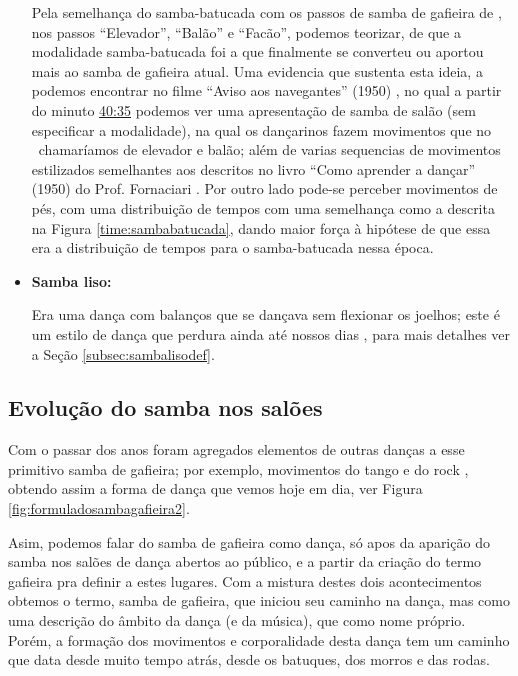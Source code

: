 \begin{itemize}
Pela semelhança do samba-batucada com os passos de samba de gafieira de \AnoLivro,
nos passos ``Elevador'', ``Balão'' e ``Facão'', podemos teorizar, de que a modalidade samba-batucada foi
a que finalmente se converteu ou aportou mais ao samba de gafieira atual.
Uma evidencia que sustenta esta ideia, a podemos encontrar no filme ``Aviso aos navegantes'' (1950) \cite[min. 40:35]{AtlantidaDance},
no qual a partir do minuto \href{http://www.bcc.org.br/filmes/443382}{40:35} podemos ver uma apresentação de samba de salão (sem especificar a modalidade),
na qual os dançarinos fazem movimentos que no \AnoLivro~chamaríamos de elevador e balão; 
além de varias sequencias de movimentos estilizados semelhantes aos descritos no livro ``Como aprender a dançar'' (1950) do Prof. Fornaciari \cite[pp. 163]{fornaciari1950aprender}.
Por outro lado pode-se perceber movimentos de pés, 
com uma distribuição de tempos com uma semelhança como a descrita na Figura \ref{time:sambabatucada},
dando maior força à hipótese de que essa era a distribuição de tempos para o samba-batucada nessa época. 

\item \textbf{Samba liso:}

Era uma dança com balanços que se dançava sem flexionar os joelhos;
este é um estilo de dança que perdura ainda até nossos 
dias \cite[pp. 58,62]{freitas1959danca} \cite[pp. 61]{fornaciari1950aprender} \cite[pp. 143]{perna2002samba}, 
para mais detalhes ver a Seção \ref{subsec:sambalisodef}.
\end{itemize}

\subsection{Evolução do samba nos salões}

Com o passar dos anos foram agregados elementos de outras danças a esse primitivo samba de gafieira;
por exemplo, movimentos do tango e do rock \cite[pp. 142]{perna2002samba}, 
obtendo assim a forma de dança que vemos hoje em dia, ver Figura \ref{fig:formuladosambagafieira2}.

Asim, podemos falar do samba de gafieira como dança, só apos da aparição do samba nos
salões de dança abertos ao público, e a partir da criação do termo gafieira pra definir a estes lugares.
Com a mistura destes dois acontecimentos obtemos o termo, samba de gafieira,
que iniciou seu caminho na dança, mas como uma descrição do âmbito da dança (e da música), que como nome próprio.
Porém, a formação dos movimentos e corporalidade desta dança tem um caminho que data desde muito tempo atrás,
desde os batuques, dos morros e das rodas.


